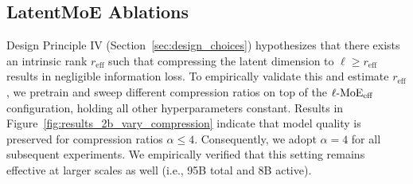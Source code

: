 \begin{table}[ht!]
    \centering
    \caption{Architectural specifications of the baseline models used for design space exploration. For the Hybrid model's Mamba layers, we use Mamba-2 blocks with 128 heads, 64 head dimension, 128 state dimension, and 8 groups.}
    \label{tbl:model_arch}
\end{table}

\subsection{LatentMoE Ablations}

 Design Principle IV (Section~\ref{sec:design_choices}) hypothesizes that there exists an intrinsic rank $r_{\mathrm{eff}}$ such that compressing the latent dimension to $\ell \ge r_{\mathrm{eff}}$ results in negligible information loss. To empirically validate this and estimate $r_{\mathrm{eff}}$, we pretrain and sweep different compression ratios on top of the $\operatorname{\ell-MoE}_\mathrm{eff}$ configuration, holding all other hyperparameters constant.
Results in Figure~\ref{fig:results_2b_vary_compression} indicate that model quality is preserved for compression ratios $\alpha \le 4$. Consequently, we adopt $\alpha = 4$ for all subsequent experiments. We empirically verified that this setting remains effective at larger scales as well (i.e., 95B total and 8B active).

